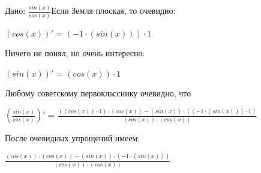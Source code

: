 \documentclass{article}
\begin{document}
Дано: $\frac{sin(x)}{cos(x)}$\bigskip Если Земля плоская, то очевидно:

$(cos(x))'$ = $(-1 \cdot (sin(x))) \cdot 1$

\bigskip Ничего не понял, но очень интересно:

$(sin(x))'$ = $(cos(x)) \cdot 1$

\bigskip Любому советскому первокласснику очевидно, что

$(\frac{sin(x)}{cos(x)})'$ = $\frac{((cos(x)) \cdot 1) \cdot (cos(x)) - (sin(x)) \cdot ((-1 \cdot (sin(x))) \cdot 1)}{(cos(x)) \cdot (cos(x))}$

\bigskip После очевидных упрощений имеем:

$\frac{(cos(x)) \cdot (cos(x)) - (sin(x)) \cdot (-1 \cdot (sin(x)))}{(cos(x)) \cdot (cos(x))}$
\end{document}
